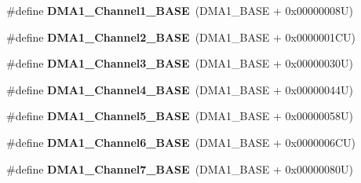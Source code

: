 \begin{DoxyCompactItemize}
\item 
\hypertarget{group___peripheral__memory__map_ga888dbc1608243badeb3554ffedc7364c}{\#define {\bfseries D\-M\-A1\-\_\-\-Channel1\-\_\-\-B\-A\-S\-E}~(D\-M\-A1\-\_\-\-B\-A\-S\-E + 0x00000008\-U)}\label{group___peripheral__memory__map_ga888dbc1608243badeb3554ffedc7364c}

\item 
\hypertarget{group___peripheral__memory__map_ga38a70090eef3687e83fa6ac0c6d22267}{\#define {\bfseries D\-M\-A1\-\_\-\-Channel2\-\_\-\-B\-A\-S\-E}~(D\-M\-A1\-\_\-\-B\-A\-S\-E + 0x0000001\-C\-U)}\label{group___peripheral__memory__map_ga38a70090eef3687e83fa6ac0c6d22267}

\item 
\hypertarget{group___peripheral__memory__map_ga70b3d9f36ca9ce95b4e421c11154fe5d}{\#define {\bfseries D\-M\-A1\-\_\-\-Channel3\-\_\-\-B\-A\-S\-E}~(D\-M\-A1\-\_\-\-B\-A\-S\-E + 0x00000030\-U)}\label{group___peripheral__memory__map_ga70b3d9f36ca9ce95b4e421c11154fe5d}

\item 
\hypertarget{group___peripheral__memory__map_ga1adc93cd0baf0897202c71110e045692}{\#define {\bfseries D\-M\-A1\-\_\-\-Channel4\-\_\-\-B\-A\-S\-E}~(D\-M\-A1\-\_\-\-B\-A\-S\-E + 0x00000044\-U)}\label{group___peripheral__memory__map_ga1adc93cd0baf0897202c71110e045692}

\item 
\hypertarget{group___peripheral__memory__map_gac041a71cd6c1973964f847a68aa14478}{\#define {\bfseries D\-M\-A1\-\_\-\-Channel5\-\_\-\-B\-A\-S\-E}~(D\-M\-A1\-\_\-\-B\-A\-S\-E + 0x00000058\-U)}\label{group___peripheral__memory__map_gac041a71cd6c1973964f847a68aa14478}

\item 
\hypertarget{group___peripheral__memory__map_ga896c2c7585dd8bc3969cf8561f689d2d}{\#define {\bfseries D\-M\-A1\-\_\-\-Channel6\-\_\-\-B\-A\-S\-E}~(D\-M\-A1\-\_\-\-B\-A\-S\-E + 0x0000006\-C\-U)}\label{group___peripheral__memory__map_ga896c2c7585dd8bc3969cf8561f689d2d}

\item 
\hypertarget{group___peripheral__memory__map_gaeee0d1f77d0db1db533016a09351166c}{\#define {\bfseries D\-M\-A1\-\_\-\-Channel7\-\_\-\-B\-A\-S\-E}~(D\-M\-A1\-\_\-\-B\-A\-S\-E + 0x00000080\-U)}\label{group___peripheral__memory__map_gaeee0d1f77d0db1db533016a09351166c}


\end{DoxyCompactItemize}
